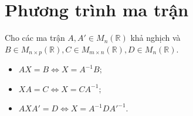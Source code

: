 \section{Phương trình ma trận}
\begin{mybox}
\begin{theorem}
Cho các ma trận $A, A' \in M_n \left( {\mathbb{R}} \right)$ khả nghịch và $B \in {M_{n \times p}}\left( {\mathbb{R}} \right),C \in {M_{m \times n}}\left( {\mathbb{R}} \right),D \in {M_n}\left( {\mathbb{R}} \right).$
\begin{itemize}
\item $AX = B \Leftrightarrow X = {A^{-1}}B;$
\item $XA = C \Leftrightarrow X = C{A^{-1}};$
\item $AXA' = D \Leftrightarrow X = {A^{-1}}D{A'^{-1}}.$
\end{itemize}
\end{theorem}
\end{mybox}
